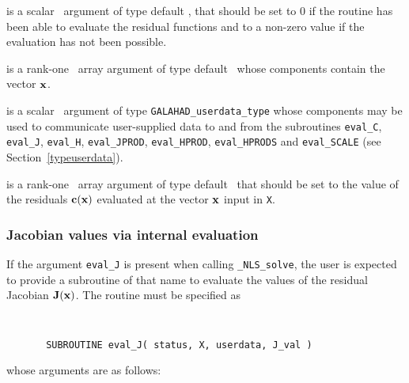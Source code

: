 \documentclass{galahad}
\newcommand{\packagename}{NLS}
\newcommand{\fullpackagename}{\libraryname\_\packagename}
\newcommand{\solver}{{\tt \fullpackagename\_solve}}
\begin{document}
\begin{description}
 is a scalar \intentout\ argument of type default \integer,
that should be set to 0 if the routine has been able to evaluate
the residual functions
and to a non-zero value if the evaluation has not been possible.

 is a rank-one \intentin\ array argument of type default \realdp\
whose components contain the vector ${\mathbf{x}}$.

 is a scalar \intentinout\ argument of type
{\tt GALAHAD\_userdata\_type} whose components may be used
to communicate user-supplied data to and from the subroutines
{\tt eval\_C}, {\tt eval\_J}, {\tt eval\_H}, {\tt eval\_JPROD},
{\tt eval\_HPROD}, {\tt eval\_HPRODS} and {\tt eval\_SCALE}
(see Section~\ref{typeuserdata}).

 is a rank-one \intentout\ array argument of type default \realdp\
that should be set to the value of the residuals ${\mathbf{c}}({\mathbf{x}})$
evaluated at the vector ${\mathbf{x}}$ input in {\tt X}.

\end{description}


\subsubsection{Jacobian values via internal evaluation\label{jfv}}

If the argument {\tt eval\_J} is present when calling \solver, the
user is expected to provide a subroutine of that name to evaluate the
values of the residual Jacobian ${\mathbf{J}}({\mathbf{x}})$.
The routine must be specified as

\def\baselinestretch{0.8}
{\tt
\begin{verbatim}
       SUBROUTINE eval_J( status, X, userdata, J_val )
\end{verbatim} }
\def\baselinestretch{1.0}
\noindent whose arguments are as follows:
\end{document}
